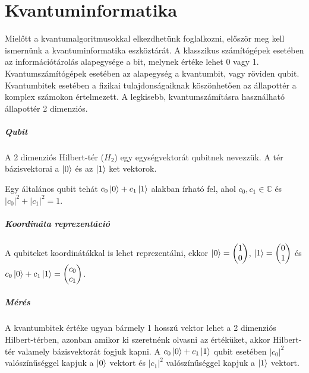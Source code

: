 \chapter{Kvantuminformatika}

Mielőtt a kvantumalgoritmusokkal elkezdhetünk foglalkozni, először meg kell
ismernünk a kvantuminformatika eszköztárát. A klasszikus számítógépek esetében
az információtárolás alapegysége a bit, melynek értéke lehet 0 vagy 1.
Kvantumszámítógépek esetében az alapegység a kvantumbit, vagy röviden qubit.
Kvantumbitek esetében a fizikai tulajdonságaiknak köszönhetően az állapottér a
komplex számokon értelmezett. A legkisebb, kvantumszámításra használható
állapottér 2 dimenziós.

\paragraph{Qubit} A 2 dimenziós Hilbert-tér ($H_2$) egy egységvektorát qubitnek
nevezzük. A tér bázisvektorai a $\ket{0}$ és az $\ket{1}$ ket vektorok.

Egy általános qubit tehát $c_0\ket{0} + c_1\ket{1}$ alakban írható fel, ahol
$c_0, c_1 \in{} \mathds{C}$ és $|c_0|^2 + |c_1|^2 = 1$.

\paragraph{Koordináta reprezentáció} A qubiteket koordinátákkal is lehet
reprezentálni, ekkor $\ket{0} = \begin{pmatrix} 1 \\ 0 \end{pmatrix}$, $\ket{1}
  = \begin{pmatrix} 0 \\ 1 \end{pmatrix}$ és $c_0\ket{0} + c_1\ket{1} =
  \begin{pmatrix} c_0 \\ c_1 \end{pmatrix}$.

\paragraph{Mérés} A kvantumbitek értéke ugyan bármely 1 hosszú vektor lehet a 2
dimenziós Hilbert-térben, azonban amikor ki szeretnénk olvasni az értéküket,
akkor Hilbert-tér valamely bázisvektorát fogjuk kapni. A $c_0\ket{0} +
  c_1\ket{1}$ qubit esetében $|c_0|^2$ valószínűséggel kapjuk a $\ket{0}$ vektort
és $|c_1|^2$ valószínűséggel kapjuk a $\ket{1}$ vektort.

